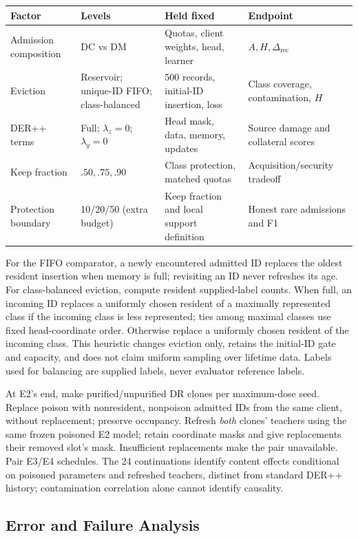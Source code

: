 \documentclass[10pt,a4paper]{article}
\begin{document}
\begin{longtable}{p{2.1cm}l l l}
\toprule
Factor & Levels & Held fixed & Endpoint\\
\midrule
Admission composition & DC vs DM & Quotas, client weights, head, learner & $A,H,\Delta_{\mathrm{rec}}$\\
Eviction & Reservoir; unique-ID FIFO; class-balanced & 500 records, initial-ID insertion, loss & Class coverage, contamination, $H$\\
DER++ terms & Full; $\lambda_z=0$; $\lambda_y=0$ & Head mask, data, memory, updates & Source damage and collateral scores\\
Keep fraction & $.50,.75,.90$ & Class protection, matched quotas & Acquisition/security tradeoff\\
Protection boundary & 10/20/50 (extra budget) & Keep fraction and local support definition & Honest rare admissions and F1\\
\bottomrule
\end{longtable}

For the FIFO comparator, a newly encountered admitted ID replaces the oldest resident insertion when memory is full; revisiting an ID never refreshes its age. For class-balanced eviction, compute resident supplied-label counts. When full, an incoming ID replaces a uniformly chosen resident of a maximally represented class if the incoming class is less represented; ties among maximal classes use fixed head-coordinate order. Otherwise replace a uniformly chosen resident of the incoming class. This heuristic changes eviction only, retains the initial-ID gate and capacity, and does not claim uniform sampling over lifetime data. Labels used for balancing are supplied labels, never evaluator reference labels.

At E2's end, make purified/unpurified DR clones per maximum-dose seed. Replace poison with nonresident, nonpoison admitted IDs from the same client, without replacement; preserve occupancy. Refresh \emph{both} clones' teachers using the same frozen poisoned E2 model; retain coordinate masks and give replacements their removed slot's mask. Insufficient replacements make the pair unavailable. Pair E3/E4 schedules. The 24 continuations identify content effects conditional on poisoned parameters and refreshed teachers, distinct from standard DER++ history; contamination correlation alone cannot identify causality.

\subsection{Error and Failure Analysis}
\end{document}
